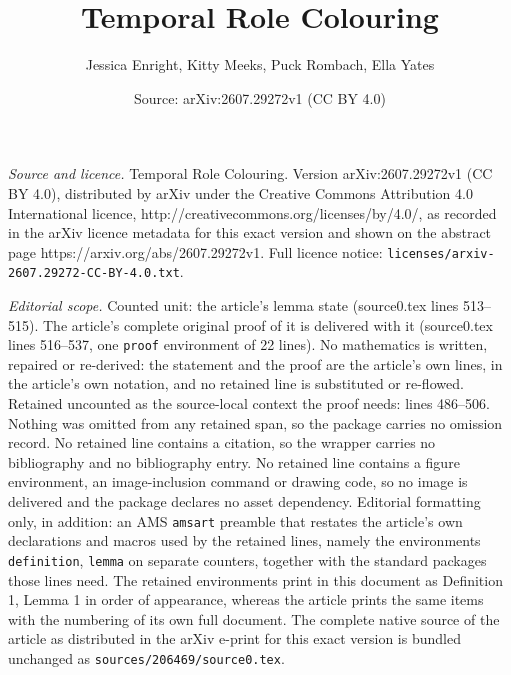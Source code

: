 \documentclass[10pt,a4paper]{amsart}
\title{Temporal Role Colouring}
\author{Jessica Enright, Kitty Meeks, Puck Rombach, Ella Yates}
\date{Source: arXiv:2607.29272v1 (CC BY 4.0)}
\begin{document}
\maketitle

\noindent\emph{Source and licence.} Temporal Role Colouring. Version arXiv:2607.29272v1 (CC BY 4.0), distributed by arXiv under the Creative Commons Attribution 4.0 International licence, http://creativecommons.org/licenses/by/4.0/, as recorded in the arXiv licence metadata for this exact version and shown on the abstract page https://arxiv.org/abs/2607.29272v1. Full licence notice: \texttt{licenses/arxiv-2607.29272-CC-BY-4.0.txt}.\par\smallskip

\noindent\textit{Editorial scope.} Counted unit: the article's lemma state (source0.tex lines 513--515). The article's complete original proof of it is delivered with it (source0.tex lines 516--537, one \texttt{proof} environment of 22 lines). No mathematics is written, repaired or re-derived: the statement and the proof are the article's own lines, in the article's own notation, and no retained line is substituted or re-flowed.  Retained uncounted as the source-local context the proof needs: lines 486--506.  Nothing was omitted from any retained span, so the package carries no omission record.  No retained line contains a citation, so the wrapper carries no bibliography and no bibliography entry.  No retained line contains a figure environment, an image-inclusion command or drawing code, so no image is delivered and the package declares no asset dependency.  Editorial formatting only, in addition: an AMS \texttt{amsart} preamble that restates the article's own declarations and macros used by the retained lines, namely the environments \texttt{definition}, \texttt{lemma} on separate counters, together with the standard packages those lines need.  The retained environments print in this document as Definition 1, Lemma 1 in order of appearance, whereas the article prints the same items with the numbering of its own full document.  The complete native source of the article as distributed in the arXiv e-print for this exact version is bundled unchanged as \texttt{sources/206469/source0.tex}.
\end{document}
